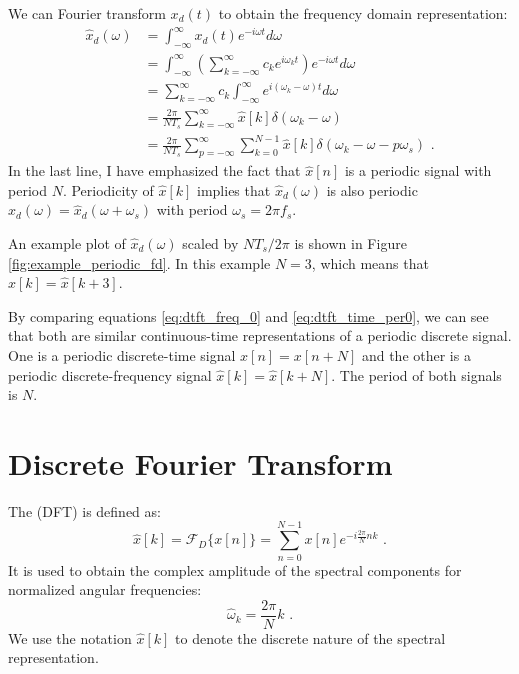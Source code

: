 We can Fourier transform $x_d(t)$ to obtain the frequency domain
representation:
\begin{align}
  \hat{x}_d(\omega) & = \int_{-\infty}^{\infty} x_d(t) e^{-i\omega t}d\omega                                                                          \\
                    & = \int_{-\infty}^{\infty} \left(\sum_{k=-\infty}^{\infty} c_k e^{i\omega_k t}\right) e^{-i\omega t} d\omega                     \\
                    & = \sum_{k=-\infty}^{\infty} c_k \int_{-\infty}^{\infty}  e^{i(\omega_k-\omega) t} d\omega                                       \\
                    & = \frac{2\pi}{N T_s}\sum_{k=-\infty}^{\infty} \hat{x}[k] \delta\left(\omega_k-\omega\right)                                     \\
                    & = \frac{2\pi}{N T_s}\sum_{p=-\infty}^{\infty} \sum_{k=0}^{N-1} \hat{x}[k] \delta\left(\omega_k-\omega - p \omega_s\right) \,\,.
  \label{eq:dtft_freq_0}
\end{align}
In the last line, I have emphasized the fact that $\hat{x}[n]$ is a
periodic signal with period $N$. Periodicity of $\hat{x}[k]$ implies
that $\hat{x}_d(\omega)$ is also periodic $\hat{x}_d(\omega)
  = \hat{x}_d(\omega+\omega_s)$ with period $\omega_s = 2\pi f_s$.

An example plot of $\hat{x}_d(\omega)$ scaled by $N T_s/2\pi$ is shown
in Figure \ref{fig:example_periodic_fd}. In this example $N=3$, which
means that $\hat{x}[k]=\hat{x}[k+3]$.

By comparing equations \ref{eq:dtft_freq_0}
and \ref{eq:dtft_time_per0}, we can see that both are similar
continuous-time representations of a periodic discrete signal. One is
a periodic discrete-time signal $x[n]=x[n+N]$ and the other is a
periodic discrete-frequency signal $\hat{x}[k]=\hat{x}[k+N]$. The
period of both signals is $N$.


\newpage
\section{Discrete Fourier Transform}

The  (DFT) is defined as:
\begin{equation}
  \boxed{
    \hat{x}[k] = \mathcal{F}_D\{x[n]\} =\sum_{n=0}^{N-1} x[n] e^{-i\frac{2\pi}{N} nk}
  } \,\,.
  \label{eq:dft_forward_eq}
\end{equation}
It is used to obtain the complex amplitude of the spectral components
for normalized angular frequencies:
\begin{equation}
  \boxed{
    \hat{\omega}_k = \frac{2\pi}{N}k
  } \,\,.
\end{equation}
We use the notation $\hat{x}[k]$ to denote the discrete nature of the
spectral representation.

